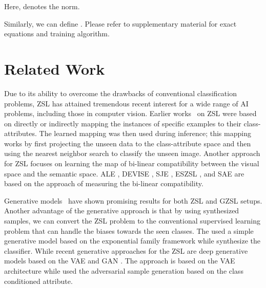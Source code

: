 \documentclass[10pt,twocolumn,letterpaper]{article}
\begin{document}
Here,  denotes the  norm.

Similarly, we can define . Please refer to supplementary  material for exact equations and training algorithm.



































\section{Related Work}
\label{sec:relwork}
Due to its ability to overcome the drawbacks of conventional classification problems, ZSL has attained tremendous recent interest for a wide range of AI problems, including those in computer vision. Earlier works~\cite{DAP,IAP} on ZSL were based on directly or indirectly mapping the instances of specific examples to their class-attributes. The learned mapping was then used during inference; this mapping works by first projecting the unseen data to the class-attribute space and then using the nearest neighbor search to classify the unseen image.
Another approach for ZSL focuses on learning the map of bi-linear compatibility between the visual space and the semantic space. ALE \cite{akata2013label}, DEVISE \cite{frome2013devise}, SJE \cite{SJE}, ESZSL \cite{ESZSL2015}, and SAE \cite{SAE2017} are based on the approach of measuring the bi-linear compatibility.




Generative models~\cite{mishra2017generative,Chen_2018_CVPR,xian2018feature,verma2017simple,guo2017synthesizing,BucherZSL,wang2017zero} have shown promising results for both ZSL and GZSL setups. Another advantage of the generative approach is that by using synthesized samples, we can convert the ZSL problem to the conventional supervised learning problem that can handle the biases towards the seen classes. The \cite{verma2017simple} used a simple generative model based on the exponential family framework while \cite{guo2017synthesizing} synthesize the classifier. While recent generative approaches for the ZSL are deep generative models based on the VAE \cite{VAE} and GAN \cite{GAN}. The approach \cite{vermageneralized,BucherZSL,mishra2017generative} is based on the VAE architecture while \cite{xian2018feature,Chen_2018_CVPR,lu2017zero} used the adversarial sample generation based on the class conditioned attribute. 
\end{document}
